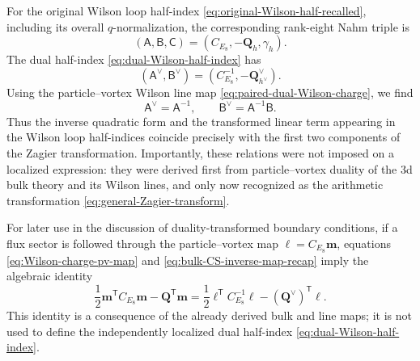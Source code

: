 \documentclass[11pt,a4paper]{article}
\numberwithin{equation}{section}
\begin{document}
For the original Wilson loop half-index \eqref{eq:original-Wilson-half-recalled}, including its overall $q$-normalization, the corresponding rank-eight Nahm triple is
\begin{equation}
  (\mathsf A,\mathsf B,\mathsf C)
  =\left(C_{E_8},-\boldsymbol Q_h,\gamma_h\right).
  \label{eq:Nahm-data-from-Wilson}
\end{equation}
The dual half-index \eqref{eq:dual-Wilson-half-index} has
\begin{equation}
  (\mathsf A^\vee,\mathsf B^\vee)
  =\left(C_{E_8}^{-1},-\boldsymbol Q_{h^\vee}^\vee\right).
\end{equation}
Using the particle--vortex Wilson line map \eqref{eq:paired-dual-Wilson-charge}, we find
\begin{equation}
  \mathsf A^\vee=\mathsf A^{-1},
  \qquad
  \mathsf B^\vee=\mathsf A^{-1}\mathsf B.
  \label{eq:pv-Zagier-matrix-map}
\end{equation}
Thus the inverse quadratic form and the transformed linear term appearing in the Wilson loop half-indices coincide precisely with the first two components of the Zagier transformation.  Importantly, these relations were not imposed on a localized expression: they were derived first from particle--vortex duality of the 3d bulk theory and its Wilson lines, and only now recognized as the arithmetic transformation \eqref{eq:general-Zagier-transform}.

For later use in the discussion of duality-transformed boundary conditions, if a flux sector is followed through the particle--vortex map $\boldsymbol\ell=C_{E_8}\boldsymbol m$, equations \eqref{eq:Wilson-charge-pv-map} and \eqref{eq:bulk-CS-inverse-map-recap} imply the algebraic identity
\begin{equation}
  \frac12\boldsymbol m^{\mathsf T}C_{E_8}\boldsymbol m
  -\boldsymbol Q^{\mathsf T}\boldsymbol m
  =
  \frac12\boldsymbol\ell^{\mathsf T}C_{E_8}^{-1}\boldsymbol\ell
  -(\boldsymbol Q^\vee)^{\mathsf T}\boldsymbol\ell.
  \label{eq:pv-Zagier-exponent}
\end{equation}
This identity is a consequence of the already derived bulk and line maps; it is not used to define the independently localized dual half-index \eqref{eq:dual-Wilson-half-index}.
\end{document}
